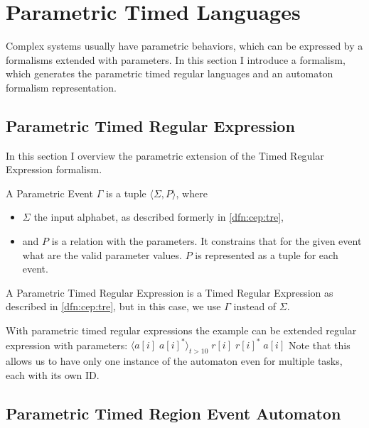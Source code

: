 	
\section{Parametric Timed Languages}
	
Complex systems usually have parametric behaviors, which can be expressed by a formalisms extended with parameters. In this section I introduce a formalism, which generates the parametric timed regular languages and an automaton formalism representation.
			
\subsection{Parametric Timed Regular Expression}
		
In this section I overview the parametric extension of the Timed Regular Expression formalism.
			
\begin{dfn}
\label{dfn:cep:ptrea:event}
A Parametric Event $\Gamma$ is a tuple $\langle \Sigma, P \rangle$, where 
\begin{itemize}
	\item $\Sigma$ the input alphabet, as described formerly in \cref{dfn:cep:tre},
	\item and $P$ is a relation with the parameters. It constrains that for the given event what are the valid parameter values. $P$ is represented as a tuple for each event.
	\end{itemize}
\end{dfn}
			
	
\begin{dfn}
A Parametric Timed Regular Expression is a Timed Regular Expression as described in \cref{dfn:cep:tre}, but in this case, we use $\Gamma$ instead of $\Sigma$.
			
\end{dfn}
			
			With parametric timed regular expressions the example can be extended regular expression with parameters:
			$ \langle a[i] \; a[i]^\ast \rangle_{t > 10} \; r[i] \; r[i]^\ast \; a[i]$ %
			Note that this allows us to have only one instance of the automaton even for multiple tasks, each with its own ID.
		
		\subsection{Parametric Timed Region Event Automaton}
			
